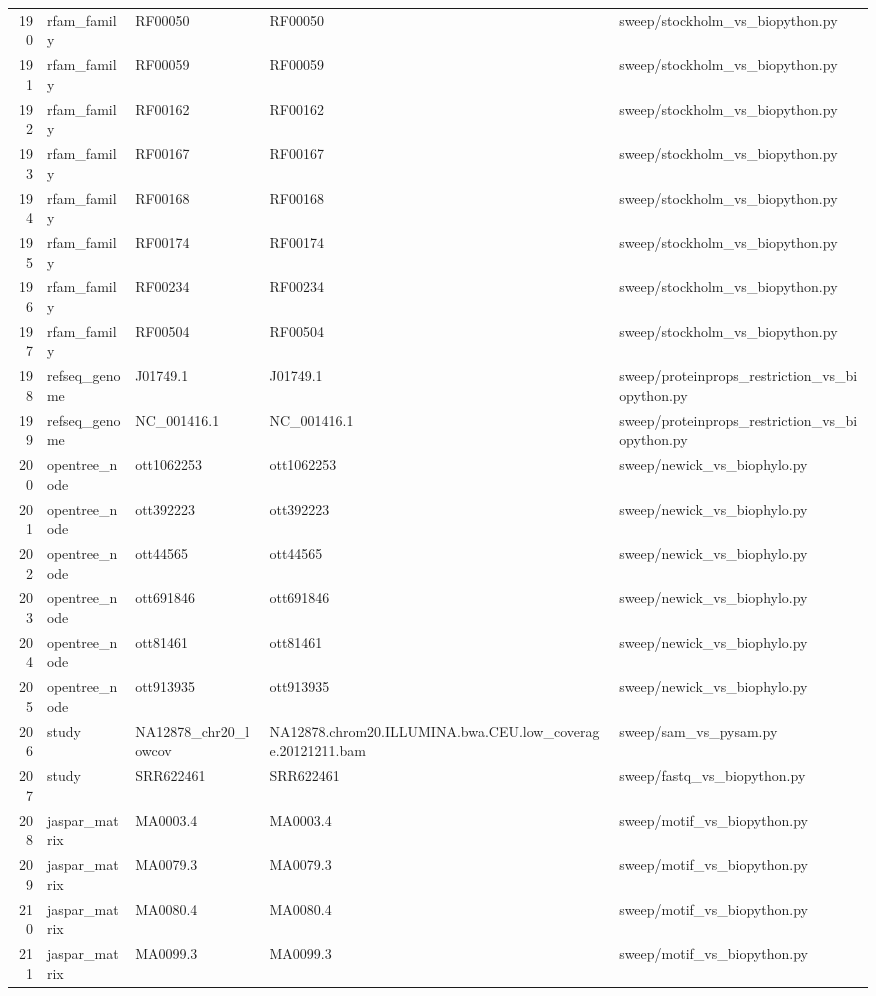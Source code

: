 {\begin{longtable}{rllp{3.2cm}p{4.2cm}}
190 & rfam\_family & RF00050 & RF00050 & sweep/stockholm\_vs\_biopython.py\\
191 & rfam\_family & RF00059 & RF00059 & sweep/stockholm\_vs\_biopython.py\\
192 & rfam\_family & RF00162 & RF00162 & sweep/stockholm\_vs\_biopython.py\\
193 & rfam\_family & RF00167 & RF00167 & sweep/stockholm\_vs\_biopython.py\\
194 & rfam\_family & RF00168 & RF00168 & sweep/stockholm\_vs\_biopython.py\\
195 & rfam\_family & RF00174 & RF00174 & sweep/stockholm\_vs\_biopython.py\\
196 & rfam\_family & RF00234 & RF00234 & sweep/stockholm\_vs\_biopython.py\\
197 & rfam\_family & RF00504 & RF00504 & sweep/stockholm\_vs\_biopython.py\\
198 & refseq\_genome & J01749.1 & J01749.1 & sweep/proteinprops\_restriction\_vs\_biopython.py\\
199 & refseq\_genome & NC\_001416.1 & NC\_001416.1 & sweep/proteinprops\_restriction\_vs\_biopython.py\\
200 & opentree\_node & ott1062253 & ott1062253 & sweep/newick\_vs\_biophylo.py\\
201 & opentree\_node & ott392223 & ott392223 & sweep/newick\_vs\_biophylo.py\\
202 & opentree\_node & ott44565 & ott44565 & sweep/newick\_vs\_biophylo.py\\
203 & opentree\_node & ott691846 & ott691846 & sweep/newick\_vs\_biophylo.py\\
204 & opentree\_node & ott81461 & ott81461 & sweep/newick\_vs\_biophylo.py\\
205 & opentree\_node & ott913935 & ott913935 & sweep/newick\_vs\_biophylo.py\\
206 & study & NA12878\_chr20\_lowcov & NA12878.chrom20.ILLUMINA.bwa.CEU.low\_coverage.20121211.bam & sweep/sam\_vs\_pysam.py\\
207 & study & SRR622461 & SRR622461 & sweep/fastq\_vs\_biopython.py\\
208 & jaspar\_matrix & MA0003.4 & MA0003.4 & sweep/motif\_vs\_biopython.py\\
209 & jaspar\_matrix & MA0079.3 & MA0079.3 & sweep/motif\_vs\_biopython.py\\
210 & jaspar\_matrix & MA0080.4 & MA0080.4 & sweep/motif\_vs\_biopython.py\\
211 & jaspar\_matrix & MA0099.3 & MA0099.3 & sweep/motif\_vs\_biopython.py\\

\end{longtable}}
